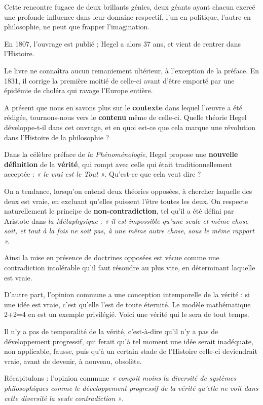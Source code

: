 Cette rencontre fugace de deux brillants génies, deux géants ayant chacun exercé une profonde influence dans leur domaine respectif, l’un en politique, l’autre en philosophie, ne peut que frapper l’imagination.

En 1807, l’ouvrage est publié ; Hegel a alors 37 ans, et vient de rentrer dans l’Histoire.

Le livre ne connaîtra aucun remaniement ultérieur, à l’exception de la préface. En 1831, il corrige la première moitié de celle-ci avant d’être emporté par une épidémie de choléra qui ravage l’Europe entière.

A présent que nous en savons plus sur le {\bf contexte} dans lequel l’œuvre a été rédigée, tournons-nous vers le {\bf contenu} même de celle-ci. Quelle théorie Hegel développe-t-il dans cet ouvrage, et en quoi est-ce que cela marque une révolution dans l’Histoire de la philosophie ?

Dans la célèbre préface de {\it la Phénoménologie}, Hegel propose une {\bf nouvelle définition} de la {\bf vérité}, qui rompt avec celle qui était traditionnellement acceptée : {\it « le vrai est le Tout »}. Qu’est-ce que cela veut dire ?

On a tendance, lorsqu’on entend deux théories opposées, à chercher laquelle des deux est vraie, en excluant qu’elles puissent l’être toutes les deux. On respecte naturellement le principe de {\bf non-contradiction}, tel qu’il a été défini par Aristote dans {\it la Métaphysique} : {\it « il est impossible qu’une seule et même chose soit, et tout à la fois ne soit pas, à une même autre chose, sous le même rapport ».}

Ainsi la mise en présence de doctrines opposées est vécue comme une contradiction intolérable qu’il faut résoudre au plus vite, en déterminant laquelle est vraie.

D’autre part, l’opinion commune a une conception intemporelle de la vérité : si une idée est vraie, c’est qu’elle l’est de toute éternité. Le modèle mathématique 2+2=4 en est un exemple privilégié. Voici une vérité qui le sera de tout temps.

Il n’y a pas de temporalité de la vérité, c’est-à-dire qu’il n’y a pas de développement progressif, qui ferait qu’à tel moment une idée serait inadéquate, non applicable, fausse, puis qu’à un certain stade de l’Histoire celle-ci deviendrait vraie, avant de devenir, à nouveau, obsolète.

Récapitulons : l’opinion commune {\it « conçoit moins la diversité de systèmes philosophiques comme le développement progressif de la vérité qu’elle ne voit dans cette diversité la seule contradiction »}.

